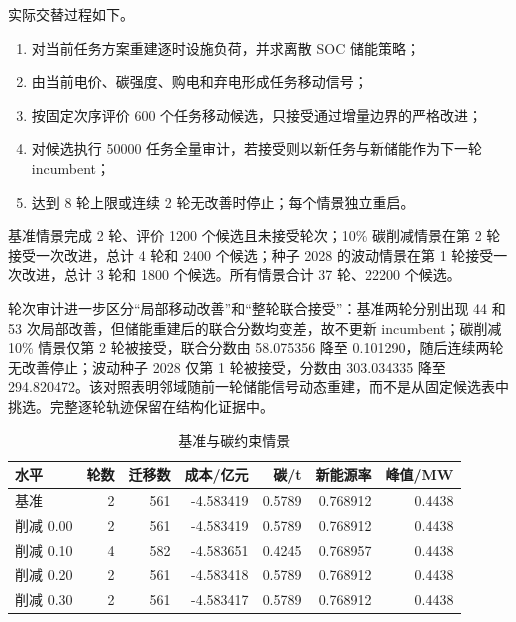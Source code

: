 \documentclass[withoutpreface,bwprint]{cumcmthesis}
\begin{document}
实际交替过程如下。
\begin{enumerate}
\item 对当前任务方案重建逐时设施负荷，并求离散 SOC 储能策略；
\item 由当前电价、碳强度、购电和弃电形成任务移动信号；
\item 按固定次序评价 600 个任务移动候选，只接受通过增量边界的严格改进；
\item 对候选执行 50000 任务全量审计，若接受则以新任务与新储能作为下一轮 incumbent；
\item 达到 8 轮上限或连续 2 轮无改善时停止；每个情景独立重启。
\end{enumerate}

基准情景完成 2 轮、评价 1200 个候选且未接受轮次；10\% 碳削减情景在第 2 轮接受一次改进，总计 4 轮和 2400 个候选；种子 2028 的波动情景在第 1 轮接受一次改进，总计 3 轮和 1800 个候选。所有情景合计 37 轮、22200 个候选。


轮次审计进一步区分“局部移动改善”和“整轮联合接受”：基准两轮分别出现 44 和 53 次局部改善，但储能重建后的联合分数均变差，故不更新 incumbent；碳削减 10\% 情景仅第 2 轮被接受，联合分数由 58.075356 降至 0.101290，随后连续两轮无改善停止；波动种子 2028 仅第 1 轮被接受，分数由 303.034335 降至 294.820472。该对照表明邻域随前一轮储能信号动态重建，而不是从固定候选表中挑选。完整逐轮轨迹保留在结构化证据中。

\begin{table}[H]\centering
{\small
\caption{基准与碳约束情景}\label{tab:q4scenarios}
\begin{tabular}{lrrrrrr}\toprule
水平 & 轮数 & 迁移数 & 成本/亿元 & 碳/t & 新能源率 & 峰值/MW\\\midrule
基准 & 2 & 561 & -4.583419 & 0.5789 & 0.768912 & 0.4438\\
削减 0.00 & 2 & 561 & -4.583419 & 0.5789 & 0.768912 & 0.4438\\
削减 0.10 & 4 & 582 & -4.583651 & 0.4245 & 0.768957 & 0.4438\\
削减 0.20 & 2 & 561 & -4.583418 & 0.5789 & 0.768912 & 0.4438\\
削减 0.30 & 2 & 561 & -4.583417 & 0.5789 & 0.768912 & 0.4438\\\bottomrule
\end{tabular}
}
\end{table}
\end{document}
